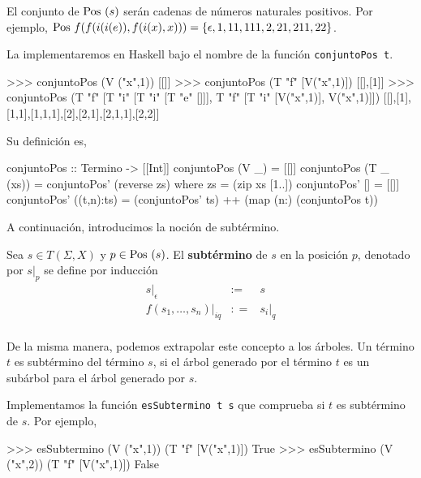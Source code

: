 El conjunto de $\mbox{Pos }(s)$ serán cadenas de números naturales
positivos. Por ejemplo,
$\mbox{Pos } f(f(i(i(e)),f(i(x),x))) = \{ \epsilon,1,11,111,2,21,211,22 \}$.

La implementaremos en Haskell bajo el nombre de la función \texttt{conjuntoPos t}.

\begin{sesion}
>>> conjuntoPos (V ("x",1))
[[]]
>>> conjuntoPos (T "f" [V("x",1)])
[[],[1]]
>>> conjuntoPos (T "f" [T "i" [T "i" [T "e" []]],
                   T "f" [T "i" [V("x",1)], V("x",1)]])
[[],[1],[1,1],[1,1,1],[2],[2,1],[2,1,1],[2,2]]
\end{sesion}

Su definición es,

\begin{codigo}
conjuntoPos :: Termino -> [[Int]]
conjuntoPos (V _) = [[]]
conjuntoPos (T _ (xs)) = conjuntoPos' (reverse zs)
    where zs = (zip xs [1..])
          conjuntoPos' [] = [[]]
          conjuntoPos' ((t,n):ts) = (conjuntoPos' ts) ++ 
                                    (map (n:) (conjuntoPos t))
\end{codigo}


A continuación, introducimos la noción de subtérmino.
\begin{defi}
  Sea $s \in T(\Sigma, X)$ y $p \in \mbox{Pos } (s)$. El \textbf{subtérmino} de $s$ en
  la posición $p$, denotado por $s|_p$ se define por inducción
  \begin{equation*}
    \begin{array}{rcl}
      s|_\epsilon & :=  & s \\
      f(s_1,\dots,s_n)|_{iq} & : = & s_i|_q \\
    \end{array}
  \end{equation*}
\end{defi}

De la misma manera, podemos extrapolar este concepto a los árboles. Un
término $t$ es subtérmino del término $s$, si el árbol generado por el
término $t$ es un subárbol para el árbol generado por $s$. 

Implementamos la función \texttt{esSubtermino t s} que comprueba si $t$ es
subtérmino de $s$. Por ejemplo,

\begin{sesion}
>>> esSubtermino (V ("x",1)) (T "f" [V("x",1)])
True
>>> esSubtermino (V ("x",2)) (T "f" [V("x",1)])
False
\end{sesion}

